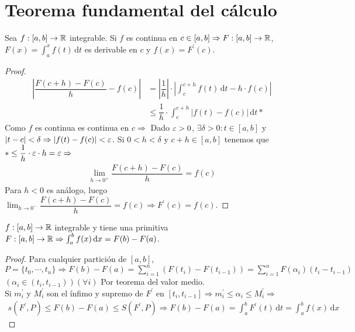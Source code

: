 \section{Teorema fundamental del cálculo}

\begin{theorem}
  Sea \(f: [a, b] \to \mathbb{R}\) integrable. Si \(f\) es continua en \(c \in [a, b] \Rightarrow F: [a, b] \to \mathbb{R}\), \(F(x) = \int_a^x f(t)\, \mathrm{d}t\) es derivable en \(c\) y \(f(x) = F^{\prime}(c)\).
  \begin{proof}
    \begin{align*}
      \left| \dfrac{F(c+h) - F(c)}{h} - f(c) \right| & = |\dfrac{1}{h}| \cdot \left| \int_c^{c+h} f(t)\, \mathrm{d}t - h \cdot f(c) \right| \\
      & \leq \dfrac{1}{h} \cdot \int_c^{c+h}| f(t) - f(c) | \, \mathrm{d}t *
    \end{align*}
    Como \(f\) es continua es continua en \(c \Rightarrow\) Dado \(\varepsilon > 0\), \(\exists \delta > 0 : t \in [a, b]\) y \(|t-c| < \delta \Rightarrow |f(t) - f(c)| < \varepsilon\).
    Si \(0 < h < \delta\) y \(c+h \in [a, b]\) tenemos que \(* \leq \dfrac{1}{h} \cdot \varepsilon \cdot h = \varepsilon \Rightarrow\) \begin{align*}
      \lim_{h \to 0^+} \dfrac{F(c+h) - F(c)}{h} = f(c)
    \end{align*}
    Para \(h < 0\) es análogo, luego \(\lim_{h \to 0^-} \dfrac{F(c+h) - F(c)}{h} = f(c) \Rightarrow F^{\prime}(c) = f(c)\).
  \end{proof}
\end{theorem}

\begin{corollary}
  \(f: [a, b] \to \mathbb{R}\) integrable y tiene una primitiva \(F: [a, b] \to \mathbb{R} \Rightarrow \int_a^b f(x) \, \mathrm{d}x = F(b) - F(a)\).
  \begin{proof}
    Para cualquier partición de \([a, b]\), \(P = \{ t_0, \cdots, t_n \} \Rightarrow F(b) - F(a) = \sum_{i = 1}^n (F(t_i) - F(t_{i-1})) = \sum_{i = 1}^n F(\alpha_i) (t_i - t_{i-1})\) \((\alpha_i \in (t_i, t_{i-1}))(\forall i)\) Por teorema del valor medio. \\
    Si \(m_i^{\prime}\) y \(M_i^{\prime}\) son el ínfimo y supremo de \(F^{\prime}\) en \([t_i, t_{i-1}] \Rightarrow m_i^{\prime} \leq \alpha_i \leq M_i^{\prime} \Rightarrow\)\
    \begin{align*}
      s(F^{\prime}, P) \leq F(b) - F(a) \leq S(F^{\prime}, P) \Rightarrow F(b) - F(a) = \int_a^b F^{\prime}(t) \, \mathrm{d}t = \int_a^b f(x) \, \mathrm{d}x
    \end{align*}
  \end{proof}
\end{corollary}

